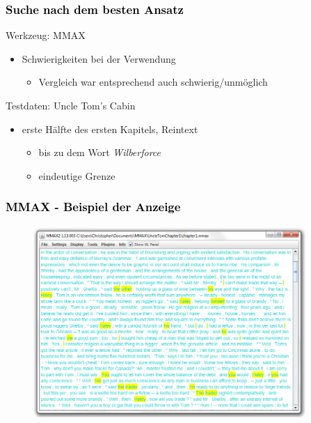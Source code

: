 \documentclass[xcolor=dvipsnames]{beamer}
\begin{document}

\begin{frame}\frametitle{\textcolor{black}{Suche nach dem besten Ansatz}}

\begin{block}{Werkzeug: MMAX}
\begin{itemize}
\item Schwierigkeiten bei der Verwendung
\begin{itemize}
\item Vergleich war entsprechend auch schwierig/unmöglich
\end{itemize}
\end{itemize}
\end{block}

\begin{block}{Testdaten: Uncle Tom's Cabin}
\begin{itemize}
\item erste Hälfte des ersten Kapitels, Reintext
\begin{itemize}
\item bis zu dem Wort \emph{Wilberforce}
\item eindeutige Grenze
\end{itemize}
\end{itemize}
\end{block}

\end{frame}


\begin{frame}\frametitle{\textcolor{black}{{MMAX - Beispiel der Anzeige}}}
\begin{figure}
\includegraphics[height=7.25cm]{cm_mmax.jpg}
\end{figure}

\end{frame}
\end{document}
